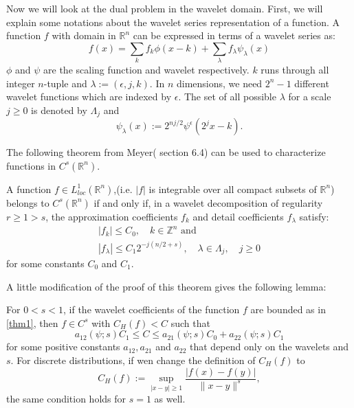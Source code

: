 \documentclass[12pt, reqno]{amsart}
\begin{document}
Now we will look at the dual problem in the wavelet domain. First, we will explain some notations about the wavelet series representation of a function. A function $f$ with domain in $\mathbb{R}^n$ can be expressed in terms of a wavelet series as:
\begin{equation}
	f(x)=\sum_{k} f_k\phi(x-k) + \sum_{\lambda} f_\lambda \psi_\lambda(x)
\end{equation}
$\phi$ and $\psi$ are the scaling function and wavelet respectively. $k$ runs through all integer $n$-tuple and $\lambda:=(\epsilon,j,k)$. In $n$ dimensions, we need $2^n-1$ different wavelet functions which are indexed by $\epsilon$. The set of all possible $\lambda$ for a scale $j\geq 0$ is denoted by $\Lambda_j$ and 
\begin{equation}
	\psi_\lambda(x):=2^{nj/2}\psi^{\epsilon}(2^jx-k).
\end{equation}

The following theorem from Meyer(\cite{meyer1992wavelets} section 6.4) can be used to characterize functions in $C^{s}(\mathbb{R}^n)$.
\begin{theorem}
A function $f\in L_{loc}^1(\mathbb{R}^n)$,(i.e. $|f|$ is integrable over all compact subsets of $\mathbb{R}^n$) belongs to $C^{s}(\mathbb{R}^n)$ if and only if, in a wavelet decomposition of regularity $r\geq 1 > s$, the approximation coefficients $f_k$ and detail coefficients $f_\lambda$ satisfy:
\begin{equation}
	\label{thm1}
	\begin{aligned}
	&|f_k| \leq C_0,\quad k\in \mathbb{Z}^n \textrm{ and } &\\ 
	&|f_\lambda| \leq C_1 2^{-j(n/2+s)},\quad \lambda\in \Lambda_j,\quad j\geq 0&
\end{aligned}
\end{equation}
for some constants $C_0$ and $C_1$.
\end{theorem}

A little modification of the proof of this theorem gives the following lemma:
\begin{lemma}
	For $0<s<1$, if the wavelet coefficients of the function $f$ are bounded as in \eqref{thm1}, then $f\in C^{s}$ with $C_H(f)<C$ such that 
\begin{equation}
	a_{12}(\psi;s)C_1\leq C \leq a_{21}(\psi;s)C_0+a_{22}(\psi;s)C_1
\end{equation}
for some positive constants $a_{12},a_{21}$ and $a_{22}$ that depend only on the wavelets and $s$. For discrete distributions, if wen change the definition of $C_H(f)$ to 
\begin{equation}
	C_H(f):=\sup_{|x-y|\geq 1} \frac{|f(x)-f(y)|}{\|x-y\|^s},
\end{equation}
the same condition holds for $s=1$ as well.
\end{lemma}
\end{document}
